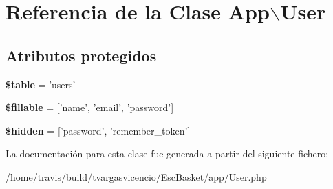 \hypertarget{class_app_1_1_user}{\section{\-Referencia de la \-Clase \-App$\backslash$\-User}
\label{class_app_1_1_user}
}
\subsection*{\-Atributos protegidos}
\begin{DoxyCompactItemize}
\item 
\hypertarget{class_app_1_1_user_a66b283fe301fb43e48e81ee0bc588d23}{{\bfseries \$table} = 'users'}\label{class_app_1_1_user_a66b283fe301fb43e48e81ee0bc588d23}

\item 
\hypertarget{class_app_1_1_user_a637d6955ce5f8fe4e36e0b9a8e0ee13e}{{\bfseries \$fillable} = \mbox{[}'name', 'email', 'password'\mbox{]}}\label{class_app_1_1_user_a637d6955ce5f8fe4e36e0b9a8e0ee13e}

\item 
\hypertarget{class_app_1_1_user_a7847d8fd83e7355b51f75bdfe8995642}{{\bfseries \$hidden} = \mbox{[}'password', 'remember\-\_\-token'\mbox{]}}\label{class_app_1_1_user_a7847d8fd83e7355b51f75bdfe8995642}

\end{DoxyCompactItemize}


\-La documentación para esta clase fue generada a partir del siguiente fichero\-:\begin{DoxyCompactItemize}
\item 
/home/travis/build/tvargasvicencio/\-Esc\-Basket/app/\-User.\-php\end{DoxyCompactItemize}
